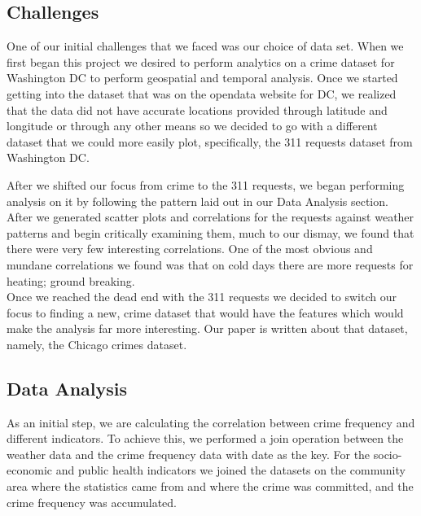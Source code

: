 \documentclass[a4paper,10pt]{article}
\begin{document}
\subsection{Challenges}
One of our initial challenges that we faced was our choice of data set. When we first began this project we desired to perform analytics on a crime dataset for Washington DC to perform geospatial and temporal analysis. Once we started getting into the dataset that was on the opendata website for DC, we realized that the data did not have accurate locations provided through latitude and longitude or through any other means so we decided to go with a different dataset that we could more easily plot, specifically, the 311 requests dataset from Washington DC.

After we shifted our focus from crime to the 311 requests, we began performing analysis on it by following the pattern laid out in our Data Analysis section. After we generated scatter plots and correlations for the requests against weather patterns and begin critically examining them, much to our dismay, we found that there were very few interesting correlations. One of the most obvious and mundane correlations we found was that on cold days there are more requests for heating; ground breaking.\\

Once we reached the dead end with the 311 requests we decided to switch our focus to finding a new, crime dataset that would have the features which would make the analysis far more interesting. Our paper is written about that dataset, namely, the Chicago crimes dataset.

\subsection{Data Analysis}

As an initial step, we are calculating the correlation between crime frequency and different indicators. To achieve this, we performed a join operation between the weather data and the crime frequency data with date as the key. For the socio-economic and public health indicators we joined the datasets on the community area where the statistics came from and where the crime was committed, and the crime frequency was accumulated.\\
\end{document}
